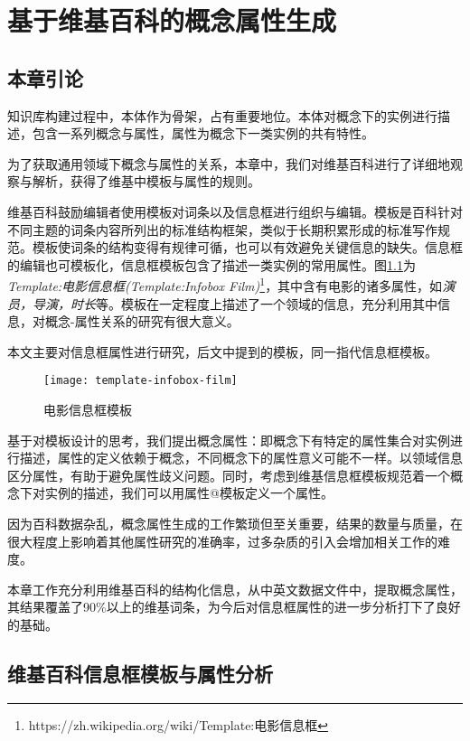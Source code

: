 \chapter{基于维基百科的概念属性生成}
\label{cha:concept-property}

\section{本章引论}

知识库构建过程中，本体作为骨架，占有重要地位。本体对概念下的实例进行描述，包含一系列概念与属性，属性为概念下一类实例的共有特性。

为了获取通用领域下概念与属性的关系，本章中，我们对维基百科进行了详细地观察与解析，获得了维基中模板与属性的规则。

维基百科鼓励编辑者使用模板对词条以及信息框进行组织与编辑。模板是百科针对不同主题的词条内容所列出的标准结构框架，类似于长期积累形成的标准写作规范。模板使词条的结构变得有规律可循，也可以有效避免关键信息的缺失。信息框的编辑也可模板化，信息框模板包含了描述一类实例的常用属性。图\ref{fig:template-infobox-film}为\textit{Template:电影信息框(Template:Infobox Film)}\footnote{https://zh.wikipedia.org/wiki/Template:电影信息框}，其中含有电影的诸多属性，如\textit{演员，导演，时长}等。模板在一定程度上描述了一个领域的信息，充分利用其中信息，对概念-属性关系的研究有很大意义。

本文主要对信息框属性进行研究，后文中提到的模板，同一指代{\heiti 信息框模板}。

\begin{figure}[H]
  \centering
  \texttt{[image: template-infobox-film]}
  \caption{电影信息框模板}
  \label{fig:template-infobox-film}
\end{figure}

基于对模板设计的思考，我们提出概念属性：即概念下有特定的属性集合对实例进行描述，属性的定义依赖于概念，不同概念下的属性意义可能不一样。以领域信息区分属性，有助于避免属性歧义问题。同时，考虑到维基信息框模板规范着一个概念下对实例的描述，我们可以用{\heiti 属性@模板}定义一个属性。

因为百科数据杂乱，概念属性生成的工作繁琐但至关重要，结果的数量与质量，在很大程度上影响着其他属性研究的准确率，过多杂质的引入会增加相关工作的难度。

本章工作充分利用维基百科的结构化信息，从中英文数据文件中，提取概念属性，其结果覆盖了90\%以上的维基词条，为今后对信息框属性的进一步分析打下了良好的基础。

\section{维基百科信息框模板与属性分析}
\label{sec:template-analysis}

